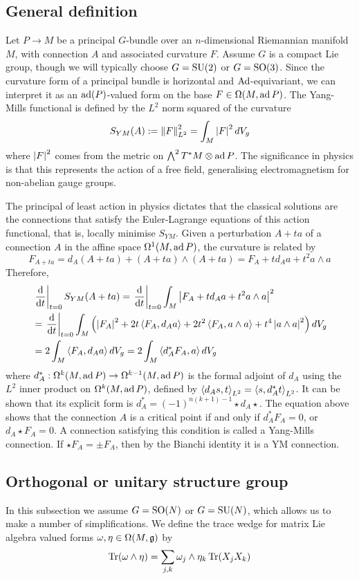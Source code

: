 \subsection{General definition}
Let $P\to M$ be a principal $G$-bundle over an $n$-dimensional Riemannian 
manifold $M$, with connection $A$ and associated curvature $F$. 
Assume $G$ is a compact Lie group,
though we will typically choose $G=\operatorname{SU}(2)$ or $G=\operatorname{SO}(3)$. 
Since the curvature form of a principal bundle is horizontal and  
$\operatorname{Ad}$-equivariant, we can interpret it as an $\operatorname{ad}(P)$-valued form on the base 
$F\in\Omega(M,\operatorname{ad} P)$.
The Yang-Mills functional is defined by the $L^2$ norm squared of the curvature 
\[
	S_{YM}(A) := \norm{F}^2_{L^2} = \int_M \abs{F}^2 dV_g
\]
where $\abs{F}^2$ comes from the metric on $\bigwedge^2T^*M\otimes \operatorname{ad} P$. 
The significance in physics is that this represents the action of a free field, 
generalising electromagnetism for non-abelian gauge groups.\cite[p. 277]{baez}  

The principal of least action in physics dictates that the classical solutions
are the connections that satisfy the Euler-Lagrange equations of this action 
functional, that is, locally minimise $S_{YM}$. Given a perturbation
$A+ta$ of a connection  $A$ in the affine space $\Omega^1(M,\operatorname{ad} P)$, the 
curvature is related by
\[
F_{A+ta} = d_A(A+ta) + (A+ta)\wedge (A+ta) = F_A + td_A a + t^2a\wedge a
\] 
Therefore,
\begin{align*}
	&\odv{}{t}_{t=0}S_{YM}(A+ta)
	= \odv{}{t}_{t=0} \int_M \abs{F_A + td_A a + t^2a\wedge a}^2 \\
	&= \odv{}{t}_{t=0} \int_M \paren{\abs{F_A}^2 + 2t\gen{F_A,d_A a} 
	+ 2t^2\gen{F_A,a\wedge a} + t^4 \abs{a\wedge a}^2} dV_g \\
	&=  2\int_M  \gen{F_A,d_A a}  dV_g 
	=  2\int_M  \gen{d_A^*F_A, a}  dV_g 
\end{align*}
where $d_A^* :\Omega^{k}(M,\operatorname{ad} P)\to \Omega^{k-1}(M,\operatorname{ad} P)$ is the formal adjoint of 
$d_A$ using the $L^2$ inner product on
$\Omega^k(M,\operatorname{ad} P)$, defined by $\gen{d_A s, t}_{L^2} = \gen{s,d_A^*t}_{L^2}$.
It can be shown that its explicit form is $d_A^* = (-1)^{n(k+1)-1}\star d_A \star$.
The equation above shows that the connection $A$ is a critical point if and only
if  $d_A^* F_A = 0$, or $d_A \star F_A = 0$. A connection satisfying this
condition is called a Yang-Mills connection.
If $\star F_A = \pm F_A$, then by the Bianchi identity it is a YM connection.

\subsection{Orthogonal or unitary structure group}
In this subsection we assume $G=\operatorname{SO}(N)$ or  $G=\operatorname{SU}(N)$, which allows us to
make a number of simplifications.
We define the trace wedge for matrix Lie algebra valued forms 
$\omega,\eta\in\Omega(M,\operatorname{\mathfrak{g}})$ by  
\begin{equation} \label{eq:matrix_form_wedge}
    \operatorname{Tr}(\omega\wedge\eta) = \sum_{j,k} \omega_j\wedge \eta_k \operatorname{Tr}(X_j X_k)
\end{equation}

